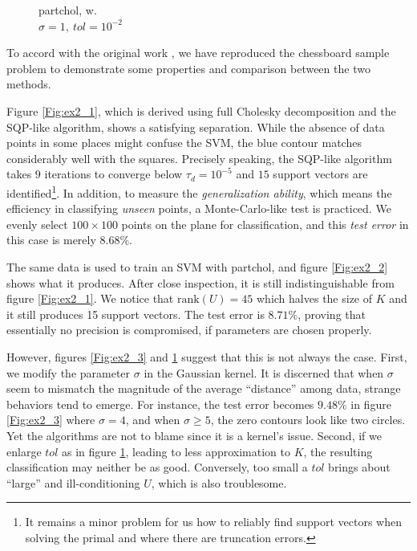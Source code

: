 \documentclass[11pt,a4paper]{article}
\theoremstyle{definition}
\begin{document}
\begin{figure}[htbp]
\begin{minipage}[t]{0.24\linewidth}
          \caption{\label{Fig:ex2_4}\textsf{partchol}, w.\protect\\$\sigma=1,~tol=10^{-2}$}
        \end{minipage}
      \end{figure}
      To accord with the original work \cite{fletcher2010binary}, we have reproduced the chessboard sample problem to demonstrate some properties and comparison between the two methods.

      Figure \ref{Fig:ex2_1}, which is derived using full Cholesky decomposition and the SQP-like algorithm, shows a satisfying separation. While the absence of data points in some places might confuse the SVM, the blue contour matches considerably well with the squares. Precisely speaking, the SQP-like algorithm takes $9$ iterations to converge below $\tau_{d}=10^{-5}$ and $15$ support vectors are identified\footnote{It remains a minor problem for us how to reliably find support vectors when solving the primal and where there are truncation errors.}. In addition, to measure the \textit{generalization ability}, which means the efficiency in classifying \textit{unseen} points, a Monte-Carlo-like test is practiced. We evenly select $100\times 100$ points on the plane for classification, and this \textit{test error} in this case is merely $8.68\%$.

      The same data is used to train an SVM with \textsf{partchol}, and figure \ref{Fig:ex2_2} shows what it produces. After close inspection, it is still indistinguishable from figure \ref{Fig:ex2_1}. We notice that $\text{rank}(U)=45$ which halves the size of $K$ and it still produces 15 support vectors. The test error is $8.71\%$, proving that essentially no precision is compromised, if parameters are chosen properly.

      However, figures \ref{Fig:ex2_3} and \ref{Fig:ex2_4} suggest that this is not always the case. First, we modify the parameter $\sigma$ in the Gaussian kernel. It is discerned that when $\sigma$ seem to mismatch the magnitude of the average ``distance'' among data, strange behaviors tend to emerge. For instance, the test error becomes $9.48\%$ in figure \ref{Fig:ex2_3} where $\sigma=4$, and when $\sigma\geq 5$, the zero contours look like two circles. Yet the algorithms are not to blame since it is a kernel's issue. Second, if we enlarge $tol$ as in figure \ref{Fig:ex2_4}, leading to less approximation to $K$, the resulting classification may neither be as good. Conversely, too small a $tol$ brings about ``large'' and ill-conditioning $U$, which is also troublesome.
\end{document}

